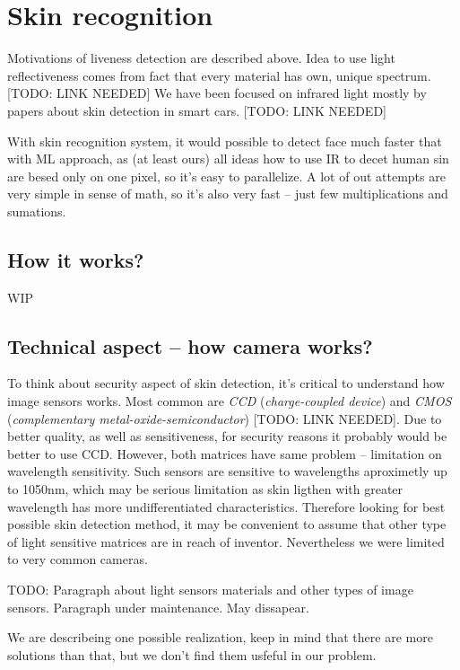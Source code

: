 \section{Skin recognition}
    Motivations of liveness detection are described above.
    Idea to use light reflectiveness comes from fact that
    every material has own, unique spectrum. [TODO: LINK NEEDED]
    We have been focused on infrared light mostly by papers about
    skin detection in smart cars. [TODO: LINK NEEDED]

    With skin recognition system, it would possible to
    detect face much faster that with ML approach,
    as (at least ours) all ideas how to use IR
    to decet human sin are besed only on one pixel,
    so it's easy to parallelize.
    A lot of out attempts are very simple in sense of math,
    so it's also very fast -- just few multiplications and sumations.

    \subsection{How it works?}
        WIP

    \subsection{Technical aspect -- how camera works?}
        To think about security aspect of skin detection,
        it's critical to understand how image sensors works.
        Most common are \textit{CCD} (\textit{charge-coupled device})
        and \textit{CMOS} (\textit{complementary metal-oxide-semiconductor})
        [TODO: LINK NEEDED]. %
        Due to better quality, as well as sensitiveness, for security reasons
        it probably would be better to use CCD.
        However, both matrices have same problem -- limitation on wavelength sensitivity.
        Such sensors are sensitive to wavelengths aproximetly up to 1050nm,
        which may be serious limitation as skin ligthen with greater wavelength has
        more undifferentiated characteristics.
        Therefore looking for best possible skin detection method,
        it may be convenient to assume that other type of light sensitive matrices
        are in reach of inventor.
        Nevertheless we were limited to very common cameras.

        TODO: Paragraph about light sensors materials and other types of image sensors.
        Paragraph under maintenance. May dissapear.

        We are describeing one possible realization, keep in mind that
        there are more solutions than that, but we don't find them usfeful in our problem.

